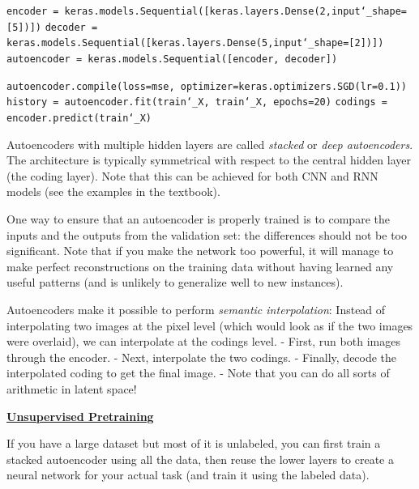 \texttt{encoder = keras.models.Sequential([keras.layers.Dense(2,input\char`_shape=[5])])}\newline
\texttt{decoder = keras.models.Sequential([keras.layers.Dense(5,input\char`_shape=[2])])}\newline
\texttt{autoencoder = keras.models.Sequential([encoder, decoder])}

\texttt{autoencoder.compile(loss=\textquotesingle mse\textquotesingle, optimizer=keras.optimizers.SGD(lr=0.1))}\newline
\texttt{history = autoencoder.fit(train\char`_X, train\char`_X, epochs=20)}\newline
\texttt{codings = encoder.predict(train\char`_X)}\newline

Autoencoders with multiple hidden layers are called \textit{stacked} or \textit{deep autoencoders}.
The architecture is typically symmetrical with respect to the central hidden layer (the coding layer).
Note that this can be achieved for both CNN and RNN models (see the examples in the textbook).

One way to ensure that an autoencoder is properly trained is to compare the inputs and the outputs from the validation set: the differences should not be too significant.
Note that if you make the network too powerful, it will manage to make perfect reconstructions on the training data without having learned any useful patterns
(and is unlikely to generalize well to new instances).

Autoencoders make it possible to perform \textit{semantic interpolation}:\newline
Instead of interpolating two images at the pixel level (which would look as if the two images were overlaid),
we can interpolate at the codings level.\newline
- First, run both images through the encoder.\newline
- Next, interpolate the two codings.\newline
- Finally, decode the interpolated coding to get the final image.\newline
- Note that you can do all sorts of arithmetic in latent space!\newline

\textbf{\underline{Unsupervised Pretraining}}

If you have a large dataset but most of it is unlabeled,
you can first train a stacked autoencoder using all the data,
then reuse the lower layers to create a neural network for your actual task (and train it using the labeled data).

